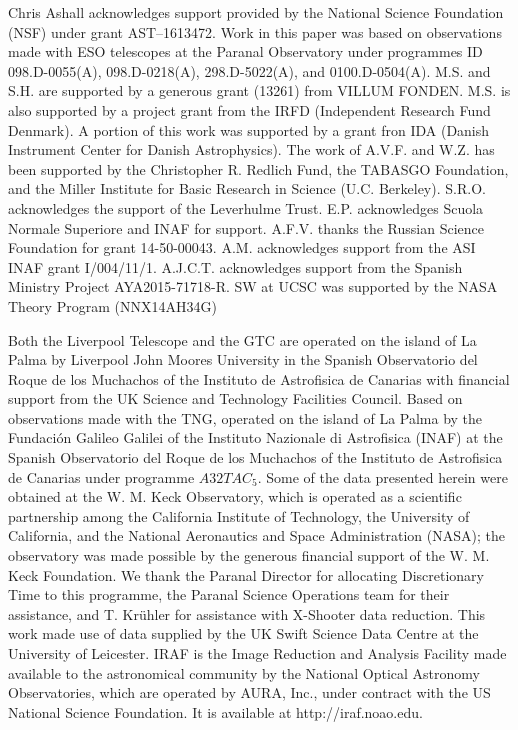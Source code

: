 \documentclass[fleqn,usenatbib]{mnras}
\begin{document}
Chris Ashall acknowledges support provided by the National Science Foundation (NSF) under grant AST--1613472.
Work in this paper was based on observations made with ESO 
telescopes at the Paranal Observatory under programmes ID  098.D-0055(A), 098.D-0218(A), 298.D-5022(A), and 0100.D-0504(A).
M.S. and S.H. are supported by a generous grant (13261) from VILLUM FONDEN. M.S. is also supported by a project grant from the IRFD (Independent Research Fund Denmark).
A portion of this work was supported by a grant fron IDA (Danish Instrument Center for Danish Astrophysics).
The work of A.V.F. and W.Z. has been supported by the 
Christopher R. Redlich Fund, the TABASGO Foundation, and the Miller
Institute for Basic Research in Science (U.C. Berkeley).
S.R.O. acknowledges the support of the Leverhulme Trust. 
E.P. acknowledges Scuola Normale Superiore and INAF for support.  
A.F.V. thanks the Russian Science Foundation for grant 14-50-00043.
A.M. acknowledges support from the ASI INAF grant I/004/11/1.
A.J.C.T. acknowledges support from the Spanish Ministry Project AYA2015-71718-R. 
SW at UCSC was supported by the NASA Theory Program (NNX14AH34G)


Both the Liverpool Telescope and the GTC are operated on the  island of La Palma by Liverpool John Moores University in the Spanish Observatorio del Roque de los Muchachos of the Instituto de Astrofisica de Canarias with financial support from the UK Science and Technology Facilities Council.
Based on observations made with the TNG, operated on the island of La Palma by the Fundaci\'{o}n Galileo Galilei 
of the Instituto Nazionale di Astrofisica (INAF) at the Spanish Observatorio del Roque
de los Muchachos of the Instituto de Astrofisica de Canarias under programme $A32TAC_5$.
Some of the data presented herein were obtained at the W. M. Keck
Observatory, which is operated as a scientific partnership among the
California Institute of Technology, the University of California, and
the National Aeronautics and Space Administration (NASA); 
the observatory was made possible by the generous financial
support of the W. M. Keck Foundation.
We thank the Paranal Director for allocating Discretionary Time to this programme, the Paranal Science Operations team for their assistance, and T. Kr\"uhler for assistance with X-Shooter data reduction. 
This work made use of data supplied by the UK Swift Science Data Centre 
at the University of Leicester.
IRAF is the Image Reduction and Analysis Facility made available
to  the  astronomical  community  by  the  National  Optical  Astronomy
Observatories, which are operated by AURA, Inc., under contract with
the US National Science Foundation. It is available at
http://iraf.noao.edu. 
\end{document}
